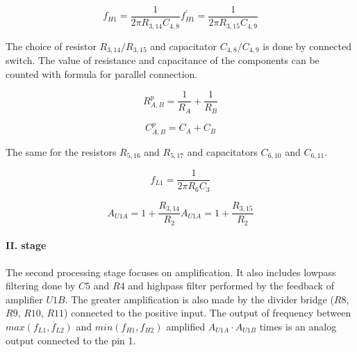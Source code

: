 \begin{subequations}
\begin{equation}
f_{H1} = \frac{1}{2 \pi R_{3,14} C_{4,8}}
\end{equation}

\begin{equation}
f_{H1}^{'} = \frac{1}{2 \pi R_{3,15} C_{4,9}}
\end{equation}
\end{subequations}

The choice of resistor $R_{3,14} / R_{3,15}$ and capacitator $C_{4,8} / C_{4,9}$
is done by connected switch. The value of resistance and capacitance of the
components can be counted with formula for parallel connection.

\begin{equation}
R_{A,B}^{p} = \frac{1}{R_A} + \frac{1}{R_B}
\end{equation}

\begin{equation}
C_{A,B}^{p} = C_A + C_B
\end{equation}

The same for the resistors $R_{5,16}$ and $R_{5,17}$ and capacitators $C_{6,10}$ and $C_{6,11}$.

\begin{equation}
f_{L1} = \frac{1}{2 \pi R_6 C_3}
\end{equation}

\begin{subequations}
\begin{equation}
A_{U1A} = 1 + \frac{R_{3,14}}{R_2}
\end{equation}
\begin{equation}
A_{U1A} = 1 + \frac{R_{3,15}}{R_2}
\end{equation}
\end{subequations}

\paragraph{II. stage}
The second processing stage focuses on amplification. It also includes lowpass filtering done
by $C5$ and $R4$ and highpass filter performed by the feedback of amplifier $U1B$. The greater
amplification is also made by the divider bridge ($R8$, $R9$, $R10$, $R11$) connected to the
positive input. The output of frequency between $max(f_{L1}, f_{L2})$ and $min(f_{H1}, f_{H2})$
amplified $A_{U1A} \cdot A_{U1B}$ times is an analog output connected to the pin 1.

